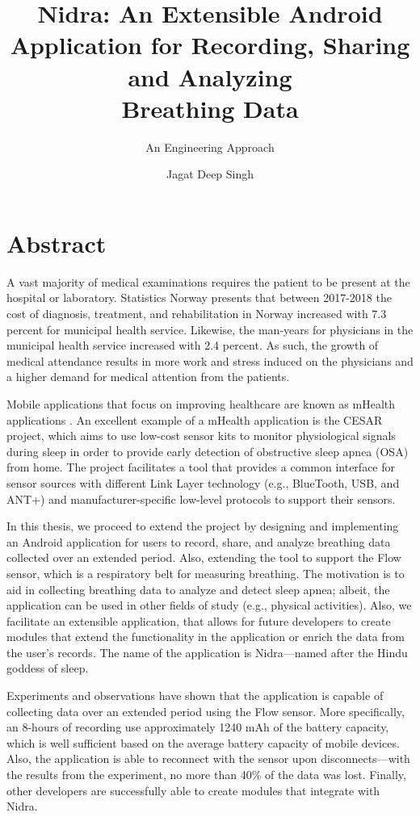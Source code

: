 \documentclass[UKenglish]{ifimaster}  %
\title{Nidra: An Extensible Android Application for Recording, Sharing and Analyzing \\ Breathing Data}
\subtitle{An Engineering Approach}
\author{Jagat Deep Singh}
\begin{document}
\duoforside[dept={Department of Informatics},   %
  program={Programming and Networks},  %
  long]                                        %

\frontmatter{}
\chapter*{Abstract}
 A vast majority of medical examinations requires the patient to be present at the hospital or laboratory. Statistics Norway \cite{ssb} presents that between 2017-2018 the cost of diagnosis, treatment, and rehabilitation in Norway increased with 7.3 percent for municipal health service. Likewise, the man-years for physicians in the municipal health service increased with 2.4 percent. As such, the growth of medical attendance results in more work and stress induced on the physicians and a higher demand for medical attention from the patients.
 
 Mobile applications that focus on improving healthcare are known as mHealth applications \cite{kumar2013mobile}. An excellent example of a mHealth application is the CESAR project, which aims to use low-cost sensor kits to monitor physiological signals during sleep in order to provide early detection of obstructive sleep apnea (OSA) \cite{cesar} from home. The project facilitates a tool that provides a common interface for sensor sources with different Link Layer technology (e.g., BlueTooth, USB, and ANT+) and manufacturer-specific low-level protocols to support their sensors.
 
 In this thesis, we proceed to extend the project by designing and implementing an Android application for users to record, share, and analyze breathing data collected over an extended period. Also, extending the tool to support the Flow sensor, which is a respiratory belt for measuring breathing. The motivation is to aid in collecting breathing data to analyze and detect sleep apnea; albeit, the application can be used in other fields of study (e.g., physical activities). Also, we facilitate an extensible application, that allows for future developers to create modules that extend the functionality in the application or enrich the data from the user's records. The name of the application is Nidra---named after the Hindu goddess of sleep. 
 
 Experiments and observations have shown that the application is capable of collecting data over an extended period using the Flow sensor. More specifically, an 8-hours of recording use approximately 1240 mAh of the battery capacity, which is well sufficient based on the average battery capacity of mobile devices. Also, the application is able to reconnect with the sensor upon disconnects---with the results from the experiment, no more than 40\% of the data was lost. Finally, other developers are successfully able to create modules that integrate with Nidra. 
\end{document}

